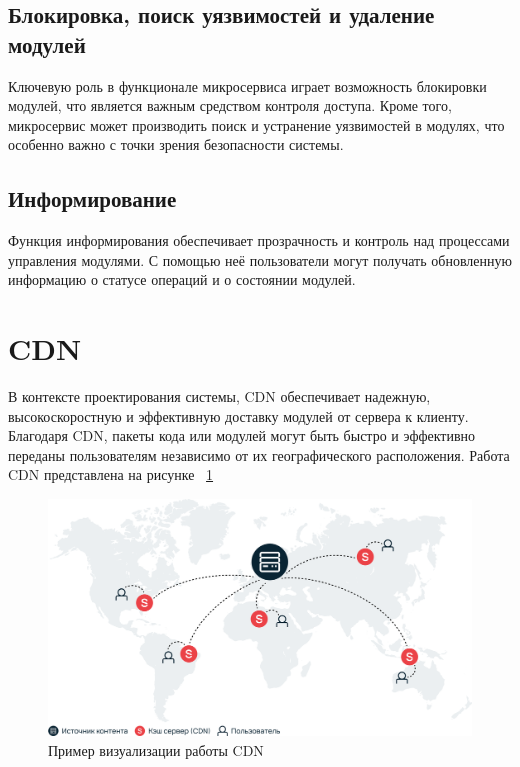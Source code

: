 \subsection{Блокировка, поиск уязвимостей и удаление модулей}
Ключевую роль в функционале микросервиса играет возможность блокировки модулей, что является важным средством контроля доступа. Кроме того, микросервис может производить поиск и устранение уязвимостей в модулях, что особенно важно с точки зрения безопасности системы.

\subsection{Информирование}
Функция информирования обеспечивает прозрачность и контроль над процессами управления модулями. С помощью неё пользователи могут получать обновленную информацию о статусе операций и о состоянии модулей.

\newpage

\section{CDN}


В контексте проектирования системы, CDN обеспечивает надежную, высокоскоростную и эффективную доставку модулей от сервера к клиенту. Благодаря CDN, пакеты кода или модулей могут быть быстро и эффективно переданы пользователям независимо от их географического расположения. Работа CDN представлена на рисунке ~\ref{fig:cdn_work}

\begin{figure}
  \centering
  \includegraphics[width=.8\textwidth]{graphics/img/sheme-cdn}
  \caption{Пример визуализации работы CDN}
  \label{fig:cdn_work}
\end{figure}

